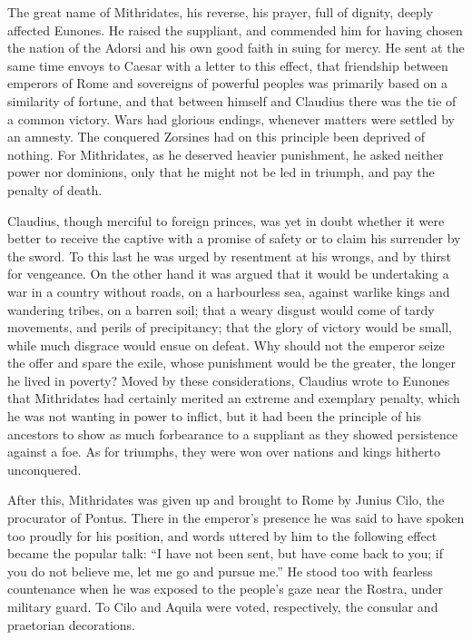 
The great name of Mithridates, his reverse, his prayer, full of dignity, deeply affected Eunones. He raised the suppliant, and commended him for having chosen the nation of the Adorsi and his own good faith in suing for mercy. He sent at the same time envoys to Caesar with a letter to this effect, that friendship between emperors of Rome and sovereigns of powerful peoples was primarily based on a similarity of fortune, and that between himself and Claudius there was the tie of a common victory. Wars had glorious endings, whenever matters were settled by an amnesty. The conquered Zorsines had on this principle been deprived of nothing. For Mithridates, as he deserved heavier punishment, he asked neither power nor dominions, only that he might not be led in triumph, and pay the penalty of death.


Claudius, though merciful to foreign princes, was yet in doubt whether it were better to receive the captive with a promise of safety or to claim his surrender by the sword. To this last he was urged by resentment at his wrongs, and by thirst for vengeance. On the other hand it was argued that it would be undertaking a war in a country without roads, on a harbourless sea, against warlike kings and wandering tribes, on a barren soil; that a weary disgust would come of tardy movements, and perils of precipitancy; that the glory of victory would be small, while much disgrace would ensue on defeat. Why should not the emperor seize the offer and spare the exile, whose punishment would be the greater, the longer he lived in poverty? Moved by these considerations, Claudius wrote to Eunones that Mithridates had certainly merited an extreme and exemplary penalty, which he was not wanting in power to inflict, but it had been the principle of his ancestors to show as much forbearance to a suppliant as they showed persistence against a foe. As for triumphs, they were won over nations and kings hitherto unconquered.


After this, Mithridates was given up and brought to Rome by Junius Cilo, the procurator of Pontus. There in the emperor's presence he was said to have spoken too proudly for his position, and words uttered by him to the following effect became the popular talk: ``I have not been sent, but have come back to you; if you do not believe me, let me go and pursue me.'' He stood too with fearless countenance when he was exposed to the people's gaze near the Rostra, under military guard. To Cilo and Aquila were voted, respectively, the consular and praetorian decorations.


